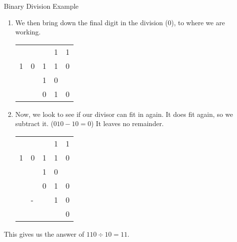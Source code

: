 \begin{example}{Binary Division Example}
\begin{enumerate}
    \item We then bring down the final digit in the division ($0$), to where we are working.
    \begin{table}[H]
        \centering
        \begin{tabularx}{0.2\textwidth}{XXXXX}
              &  &  & 1 & 1 \\
            \cline{3-5}
             1 & 0 & \multicolumn{1}{|X}{1} & 1 & 0 \\
              &  & 1 & 0 & \\
            \cline{3-4}
            &  & 0 & 1 & 0 \\
        \end{tabularx}
    \end{table}
    \item Now, we look to see if our divisor can fit in again. It does fit again, so we subtract it. ($010-10=0$) It leaves no remainder.
    \begin{table}[H]
        \centering
        \begin{tabularx}{0.2\textwidth}{XXXXX}
              &  &  & 1 & 1 \\
            \cline{3-5}
             1 & 0 & \multicolumn{1}{|X}{1} & 1 & 0 \\
              &  & 1 & 0 & \\
            \cline{3-4}
            &  & 0 & 1 & 0 \\
            & - & & 1 & 0 \\
            \cline{4-5}
            & & & & 0\\
        \end{tabularx}
    \end{table}
\end{enumerate}
This gives us the answer of $110 \div 10 = 11$.
\end{example}


